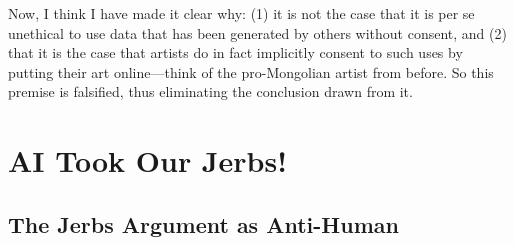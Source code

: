 \documentclass[11pt]{article}
\begin{document}

Now, I think I have made it clear why: (1) it is not the case that it is per se unethical to use data that has been generated by others without consent, and (2) that it is the case that artists do in fact implicitly consent to such uses by putting their art online---think of the pro-Mongolian artist from before. So this premise is falsified, thus eliminating the conclusion drawn from it.

\section*{AI Took Our Jerbs!}
\label{sec:orga295b8e}
\subsection*{The Jerbs Argument as Anti-Human}
\label{sec:orge567ee1}
\end{document}
